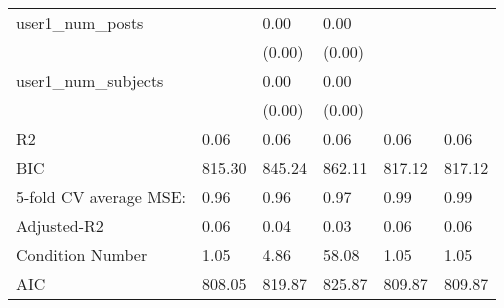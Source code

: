 \begin{table}
\begin{center}
\begin{tabular}{llllll}
user1_num_posts                                &         & 0.00    & 0.00    &         &           \\
                                               &         & (0.00)  & (0.00)  &         &           \\
user1_num_subjects                             &         & 0.00    & 0.00    &         &           \\
                                               &         & (0.00)  & (0.00)  &         &           \\
R2                                             & 0.06    & 0.06    & 0.06    & 0.06    & 0.06      \\
BIC                                            & 815.30  & 845.24  & 862.11  & 817.12  & 817.12    \\
5-fold CV average MSE:                         & 0.96    & 0.96    & 0.97    & 0.99    & 0.99      \\
Adjusted-R2                                    & 0.06    & 0.04    & 0.03    & 0.06    & 0.06      \\
Condition Number                               & 1.05    & 4.86    & 58.08   & 1.05    & 1.05      \\
AIC                                            & 808.05  & 819.87  & 825.87  & 809.87  & 809.87    \\
\hline
\end{tabular}
\end{center}
\end{table}